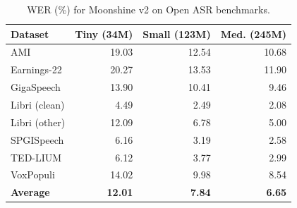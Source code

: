 \begin{table}[t]
  \centering
  \small
  \setlength{\tabcolsep}{6pt}
  \begin{tabular}{l r r r}
  \toprule
  Dataset & Tiny (34M) & Small (123M) & Med. (245M) \\
  \midrule
  AMI & 19.03 & 12.54 & 10.68 \\
  Earnings-22 & 20.27 & 13.53 & 11.90 \\
  GigaSpeech & 13.90 & 10.41 & 9.46 \\
  Libri (clean) & 4.49 & 2.49 & 2.08 \\
  Libri (other) & 12.09 & 6.78 & 5.00 \\
  SPGISpeech & 6.16 & 3.19 & 2.58 \\
  TED-LIUM & 6.12 & 3.77 & 2.99 \\
  VoxPopuli & 14.02 & 9.98 & 8.54 \\
  \midrule
  \textbf{Average} & \textbf{12.01} & \textbf{7.84} & \textbf{6.65} \\
  \bottomrule
  \end{tabular}
  \caption{WER (\%) for Moonshine v2 on Open ASR benchmarks.}
  \label{tab:open-asr-results}
\end{table}